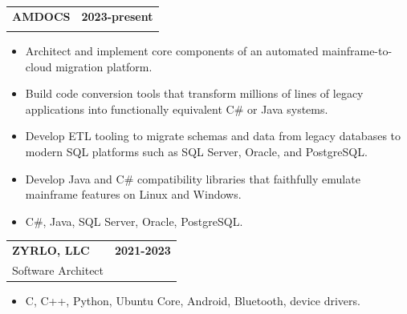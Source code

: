 \documentclass[11pt]{article}
\makeatletter
\newcommand{\IF}[2]{\iftoggle{#1}{#2}{}}
\newcommand{\IFELSE}[3]{\iftoggle{#1}{#2}{#3}}
\newcommand{\jobheading}[4]{%
  \vspace{6pt}\begin{tabularx}{\textwidth}{@{}X r@{}}
    {\textbf{#1}} & {\textbf{#2}} \\
    {{\normalsize #3}\hspace{0.5em}{\color{muted}·}\hspace{0.5em}{\color{muted}#4}} & {} \\
  \end{tabularx}\vspace{2pt}
}
\makeatother
\begin{document}
\jobheading{AMDOCS}{2023-present}{\IFELSE{MF}{Mainframe Modernization Engineer}{Cloud Migration Engineer, Platform \& Tooling}}{Remote}
\begin{itemize}
\item Architect and implement core components of an automated mainframe-to-cloud migration platform.
\item Build code conversion tools that transform millions of lines of legacy \IF{MF}{COBOL, JCL, and CICS }applications into functionally equivalent C\# or Java systems.
\item Develop ETL tooling to migrate schemas and data from legacy databases\IF{MF}{ (DB2, ADABAS, IDMS)} to modern SQL platforms such as SQL Server, Oracle, and PostgreSQL.
\item Develop Java and C\# compatibility libraries that faithfully emulate mainframe features on Linux and Windows.
\item C\#, Java, SQL Server, Oracle, PostgreSQL.
\end{itemize}

\jobheading{ZYRLO, LLC}{2021-2023}{Software Architect}{Sudbury, MA}
\begin{itemize}
\IFELSE{EMBEDDED}{%
\item Defined the software architecture and implemented core system components for an assistive device for visually impaired users.
\item Architected and built the software stack around the main CM4 controller running Ubuntu Core, with an SD410/Android subsystem for braille and accessibility, and ESP32 firmware.
\item Implemented the key software/hardware interfaces across the product stack, including custom protocols, Bluetooth, Android integration, and Linux drivers.
\item Worked with hardware engineers on schematic reviews, board bring-up, and hardware/software debugging, including bootloader configuration and driver integration.
}{%
\item Architected the software stack for an assistive device spanning CM4/Ubuntu Core, an SD410/Android subsystem for braille and accessibility, and ESP32 firmware.
\item Implemented the key software and hardware interfaces across the product stack, including custom protocols, Bluetooth, Android integration, and Linux drivers.
}%
\item C, C++, Python, Ubuntu Core, Android, Bluetooth, device drivers.
\end{itemize}
\end{document}
